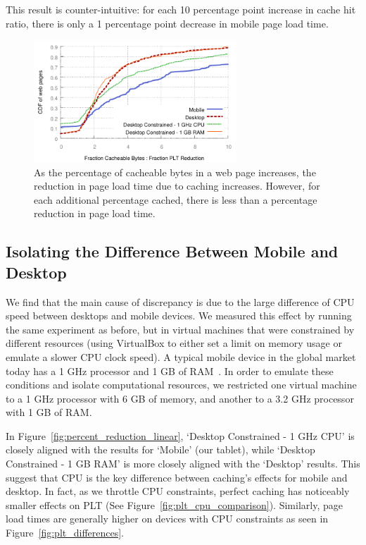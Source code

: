 This result is counter-intuitive: for each 10 percentage point increase in cache hit ratio, there is only a 1 percentage point decrease in mobile page load time.
\begin{figure}[t]
    \includegraphics[width=3in]{../graphs/ratio_bytes_to_reduction/ratio_linear_comparison.pdf}
    \caption[]{\label{fig:ratio_linear_comparison}As the percentage of cacheable bytes in a web page increases, the reduction in page load time due to caching increases. However, for each additional percentage cached, there is less than a percentage reduction in page load time.}
\end{figure}
\subsection{Isolating the Difference Between Mobile and Desktop}


We find that the main cause of discrepancy is due to the large difference of CPU speed between desktops and mobile devices. 
We measured this effect by running the same experiment as before, but in virtual machines that were constrained by different resources (using VirtualBox to either set a limit on memory usage or emulate a slower CPU clock speed).
A typical mobile device in the global market today has a 1 GHz processor and 1 GB of RAM~\cite{mobile-stats}. In order to emulate these conditions and isolate computational resources, we restricted one virtual machine to a 1 GHz processor with 6 GB of memory, and another to a 3.2 GHz processor with 1 GB of RAM.

In Figure~\ref{fig:percent_reduction_linear}, `Desktop Constrained - 1 GHz CPU' is closely aligned with the results for `Mobile' (our tablet), while `Desktop Constrained - 1 GB RAM' is more closely aligned with the `Desktop' results.
This suggest that CPU is the key difference between caching's effects for mobile and desktop.
In fact, as we throttle CPU constraints, perfect caching has noticeably smaller effects on PLT (See Figure~\ref{fig:plt_cpu_comparison}). Similarly, page load times are generally higher on devices with CPU constraints as seen in Figure~\ref{fig:plt_differences}.

